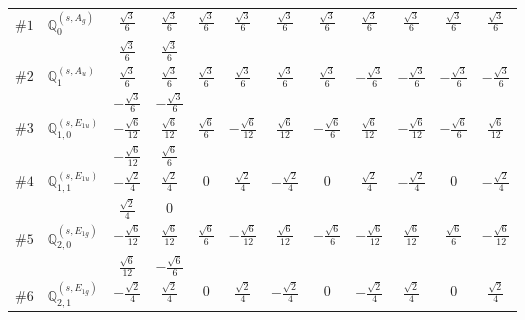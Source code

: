 \documentclass[fleqn,9pt,landscape]{jsarticle}
\begin{document}
\begin{center}
\begin{longtable}{lcccccccccc}
$ \#1\quad \mathbb{Q}_{0}^{(s,A_{g})} $ & $ \frac{\sqrt{3}}{6} $ & $ \frac{\sqrt{3}}{6} $ & $ \frac{\sqrt{3}}{6} $ & $ \frac{\sqrt{3}}{6} $ & $ \frac{\sqrt{3}}{6} $ & $ \frac{\sqrt{3}}{6} $ & $ \frac{\sqrt{3}}{6} $ & $ \frac{\sqrt{3}}{6} $ & $ \frac{\sqrt{3}}{6} $ & $ \frac{\sqrt{3}}{6} $ \\
& $ \frac{\sqrt{3}}{6} $ & $ \frac{\sqrt{3}}{6} $ & $  $ & $  $ & $  $ & $  $ & $  $ & $  $ & $  $ & $  $ \\ \hline
$ \#2\quad \mathbb{Q}_{1}^{(s,A_{u})} $ & $ \frac{\sqrt{3}}{6} $ & $ \frac{\sqrt{3}}{6} $ & $ \frac{\sqrt{3}}{6} $ & $ \frac{\sqrt{3}}{6} $ & $ \frac{\sqrt{3}}{6} $ & $ \frac{\sqrt{3}}{6} $ & $ - \frac{\sqrt{3}}{6} $ & $ - \frac{\sqrt{3}}{6} $ & $ - \frac{\sqrt{3}}{6} $ & $ - \frac{\sqrt{3}}{6} $ \\
& $ - \frac{\sqrt{3}}{6} $ & $ - \frac{\sqrt{3}}{6} $ & $  $ & $  $ & $  $ & $  $ & $  $ & $  $ & $  $ & $  $ \\ \hline
$ \#3\quad \mathbb{Q}_{1,0}^{(s,E_{1u})} $ & $ - \frac{\sqrt{6}}{12} $ & $ \frac{\sqrt{6}}{12} $ & $ \frac{\sqrt{6}}{6} $ & $ - \frac{\sqrt{6}}{12} $ & $ \frac{\sqrt{6}}{12} $ & $ - \frac{\sqrt{6}}{6} $ & $ \frac{\sqrt{6}}{12} $ & $ - \frac{\sqrt{6}}{12} $ & $ - \frac{\sqrt{6}}{6} $ & $ \frac{\sqrt{6}}{12} $ \\
& $ - \frac{\sqrt{6}}{12} $ & $ \frac{\sqrt{6}}{6} $ & $  $ & $  $ & $  $ & $  $ & $  $ & $  $ & $  $ & $  $ \\ \hline
$ \#4\quad \mathbb{Q}_{1,1}^{(s,E_{1u})} $ & $ - \frac{\sqrt{2}}{4} $ & $ \frac{\sqrt{2}}{4} $ & $ 0 $ & $ \frac{\sqrt{2}}{4} $ & $ - \frac{\sqrt{2}}{4} $ & $ 0 $ & $ \frac{\sqrt{2}}{4} $ & $ - \frac{\sqrt{2}}{4} $ & $ 0 $ & $ - \frac{\sqrt{2}}{4} $ \\
& $ \frac{\sqrt{2}}{4} $ & $ 0 $ & $  $ & $  $ & $  $ & $  $ & $  $ & $  $ & $  $ & $  $ \\ \hline
$ \#5\quad \mathbb{Q}_{2,0}^{(s,E_{1g})} $ & $ - \frac{\sqrt{6}}{12} $ & $ \frac{\sqrt{6}}{12} $ & $ \frac{\sqrt{6}}{6} $ & $ - \frac{\sqrt{6}}{12} $ & $ \frac{\sqrt{6}}{12} $ & $ - \frac{\sqrt{6}}{6} $ & $ - \frac{\sqrt{6}}{12} $ & $ \frac{\sqrt{6}}{12} $ & $ \frac{\sqrt{6}}{6} $ & $ - \frac{\sqrt{6}}{12} $ \\
& $ \frac{\sqrt{6}}{12} $ & $ - \frac{\sqrt{6}}{6} $ & $  $ & $  $ & $  $ & $  $ & $  $ & $  $ & $  $ & $  $ \\ \hline
$ \#6\quad \mathbb{Q}_{2,1}^{(s,E_{1g})} $ & $ - \frac{\sqrt{2}}{4} $ & $ \frac{\sqrt{2}}{4} $ & $ 0 $ & $ \frac{\sqrt{2}}{4} $ & $ - \frac{\sqrt{2}}{4} $ & $ 0 $ & $ - \frac{\sqrt{2}}{4} $ & $ \frac{\sqrt{2}}{4} $ & $ 0 $ & $ \frac{\sqrt{2}}{4} $ \\

\end{longtable}
\end{center}
\end{document}
